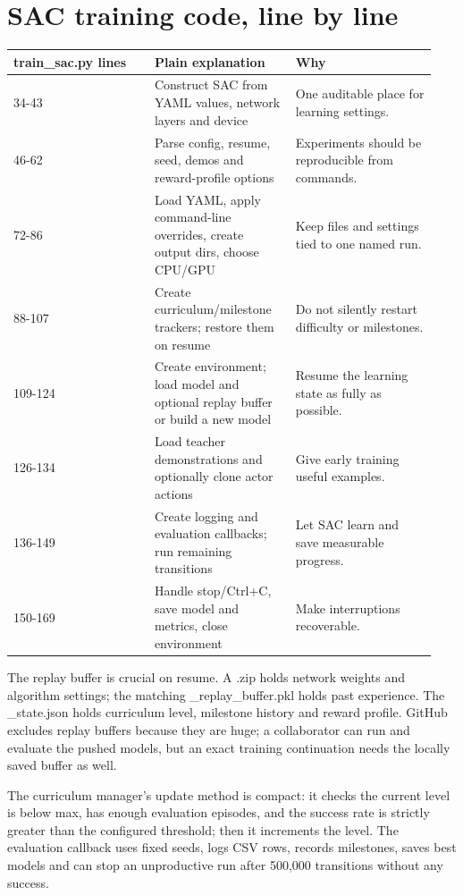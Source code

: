 \documentclass[11pt,a4paper]{article}
\begin{document}
\section{SAC training code, line by line}
\begin{longtable}{|p{0.313\linewidth}|p{0.313\linewidth}|p{0.313\linewidth}|}\hline
train\_sac.py lines & Plain explanation & Why \\ \hline
34-43 & Construct SAC from YAML values, network layers and device & One auditable place for learning settings. \\ \hline
46-62 & Parse config, resume, seed, demos and reward-profile options & Experiments should be reproducible from commands. \\ \hline
72-86 & Load YAML, apply command-line overrides, create output dirs, choose CPU/GPU & Keep files and settings tied to one named run. \\ \hline
88-107 & Create curriculum/milestone trackers; restore them on resume & Do not silently restart difficulty or milestones. \\ \hline
109-124 & Create environment; load model and optional replay buffer or build a new model & Resume the learning state as fully as possible. \\ \hline
126-134 & Load teacher demonstrations and optionally clone actor actions & Give early training useful examples. \\ \hline
136-149 & Create logging and evaluation callbacks; run remaining transitions & Let SAC learn and save measurable progress. \\ \hline
150-169 & Handle stop/Ctrl+C, save model and metrics, close environment & Make interruptions recoverable. \\ \hline
\end{longtable}
The replay buffer is crucial on resume. A .zip holds network weights and algorithm settings; the matching \_replay\_buffer.pkl holds past experience. The \_state.json holds curriculum level, milestone history and reward profile. GitHub excludes replay buffers because they are huge; a collaborator can run and evaluate the pushed models, but an exact training continuation needs the locally saved buffer as well.

The curriculum manager's update method is compact: it checks the current level is below max, has enough evaluation episodes, and the success rate is strictly greater than the configured threshold; then it increments the level. The evaluation callback uses fixed seeds, logs CSV rows, records milestones, saves best models and can stop an unproductive run after 500,000 transitions without any success.
\end{document}
